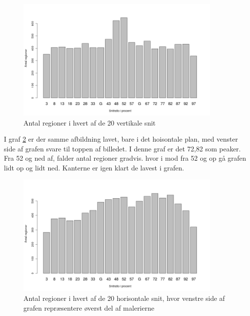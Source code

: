 {\begin{figure}[h!]
	\begin{center}
		\includegraphics[width=0.9\textwidth]{afsnit/resultater/billeder/cut0cut1eatsperratioU.png}
	\end{center}
	\caption{Antal regioner i hvert af de 20 vertikale snit}
	\label{antal_regioner_vertikale_cut_udvidet}
\end{figure}

I graf \ref{antal_regioner_horisontale_cut_udvidet} er der samme
afbildning lavet, bare i det hoisontale plan, med venster side af grafen
svare til toppen af billedet. I denne graf er det 72,82 som peaker. Fra
52 og ned af, falder antal regioner gradvis. hvor i mod fra 52 og op gå
grafen lidt op og lidt ned. Kanterne er igen klart de lavest i grafen.

\begin{figure}[h!]
	\begin{center}
		\includegraphics[width=0.9\textwidth]{afsnit/resultater/billeder/cut2cut3eatsperratioU.png}
	\end{center}
	\caption{Antal regioner i hvert af de 20 horisontale snit, hvor venstre side af grafen repræsentere øverst del af malerierne}
	\label{antal_regioner_horisontale_cut_udvidet}
\end{figure}

}
